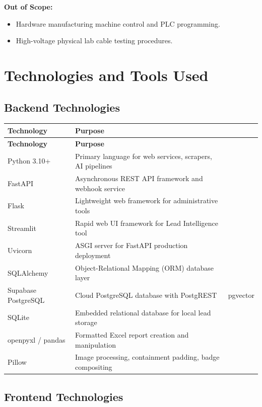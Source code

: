 \documentclass[12pt,a4paper]{report}
\begin{document}
\textbf{Out of Scope:}
\begin{itemize}[leftmargin=*,itemsep=2pt]
    \item Hardware manufacturing machine control and PLC programming.
    \item High-voltage physical lab cable testing procedures.
\end{itemize}

\section{Technologies and Tools Used}

\subsection{Backend Technologies}

\begin{longtable}{|p{4cm}|p{9cm}|}
\hline
\textbf{Technology} & \textbf{Purpose} \\
\hline
\endfirsthead
\hline
\textbf{Technology} & \textbf{Purpose} \\
\hline
\endhead
Python 3.10+ & Primary language for web services, scrapers, AI pipelines \\
\hline
FastAPI & Asynchronous REST API framework and webhook service \\
\hline
Flask & Lightweight web framework for administrative tools \\
\hline
Streamlit & Rapid web UI framework for Lead Intelligence tool \\
\hline
Uvicorn & ASGI server for FastAPI production deployment \\
\hline
SQLAlchemy & Object-Relational Mapping (ORM) database layer \\
\hline
Supabase PostgreSQL & Cloud PostgreSQL database with PostgREST & pgvector \\
\hline
SQLite & Embedded relational database for local lead storage \\
\hline
openpyxl / pandas & Formatted Excel report creation and manipulation \\
\hline
Pillow & Image processing, containment padding, badge compositing \\
\hline
\end{longtable}

\subsection{Frontend Technologies}
\end{document}
